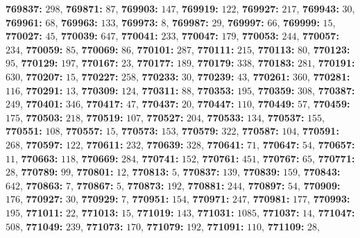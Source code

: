 \textsf{\bfseries 769837:} $298$, \textsf{\bfseries 769871:} $87$, \textsf{\bfseries 769903:} $147$, \textsf{\bfseries 769919:} $122$, \textsf{\bfseries 769927:} $217$, \textsf{\bfseries 769943:} $30$, \textsf{\bfseries 769961:} $68$, \textsf{\bfseries 769963:} $133$, \textsf{\bfseries 769973:} $8$, \textsf{\bfseries 769987:} $29$, \textsf{\bfseries 769997:} $66$, \textsf{\bfseries 769999:} $15$, \textsf{\bfseries 770027:} $45$, \textsf{\bfseries 770039:} $647$, \textsf{\bfseries 770041:} $233$, \textsf{\bfseries 770047:} $179$, \textsf{\bfseries 770053:} $244$, \textsf{\bfseries 770057:} $234$, \textsf{\bfseries 770059:} $85$, \textsf{\bfseries 770069:} $86$, \textsf{\bfseries 770101:} $287$, \textsf{\bfseries 770111:} $215$, \textsf{\bfseries 770113:} $80$, \textsf{\bfseries 770123:} $95$, \textsf{\bfseries 770129:} $197$, \textsf{\bfseries 770167:} $23$, \textsf{\bfseries 770177:} $189$, \textsf{\bfseries 770179:} $338$, \textsf{\bfseries 770183:} $281$, \textsf{\bfseries 770191:} $630$, \textsf{\bfseries 770207:} $15$, \textsf{\bfseries 770227:} $258$, \textsf{\bfseries 770233:} $30$, \textsf{\bfseries 770239:} $43$, \textsf{\bfseries 770261:} $360$, \textsf{\bfseries 770281:} $116$, \textsf{\bfseries 770291:} $13$, \textsf{\bfseries 770309:} $124$, \textsf{\bfseries 770311:} $88$, \textsf{\bfseries 770353:} $195$, \textsf{\bfseries 770359:} $308$, \textsf{\bfseries 770387:} $249$, \textsf{\bfseries 770401:} $346$, \textsf{\bfseries 770417:} $47$, \textsf{\bfseries 770437:} $20$, \textsf{\bfseries 770447:} $110$, \textsf{\bfseries 770449:} $57$, \textsf{\bfseries 770459:} $175$, \textsf{\bfseries 770503:} $218$, \textsf{\bfseries 770519:} $107$, \textsf{\bfseries 770527:} $204$, \textsf{\bfseries 770533:} $134$, \textsf{\bfseries 770537:} $155$, \textsf{\bfseries 770551:} $108$, \textsf{\bfseries 770557:} $15$, \textsf{\bfseries 770573:} $153$, \textsf{\bfseries 770579:} $322$, \textsf{\bfseries 770587:} $104$, \textsf{\bfseries 770591:} $268$, \textsf{\bfseries 770597:} $122$, \textsf{\bfseries 770611:} $232$, \textsf{\bfseries 770639:} $328$, \textsf{\bfseries 770641:} $71$, \textsf{\bfseries 770647:} $54$, \textsf{\bfseries 770657:} $11$, \textsf{\bfseries 770663:} $118$, \textsf{\bfseries 770669:} $284$, \textsf{\bfseries 770741:} $152$, \textsf{\bfseries 770761:} $451$, \textsf{\bfseries 770767:} $65$, \textsf{\bfseries 770771:} $28$, \textsf{\bfseries 770789:} $99$, \textsf{\bfseries 770801:} $12$, \textsf{\bfseries 770813:} $5$, \textsf{\bfseries 770837:} $139$, \textsf{\bfseries 770839:} $159$, \textsf{\bfseries 770843:} $642$, \textsf{\bfseries 770863:} $7$, \textsf{\bfseries 770867:} $5$, \textsf{\bfseries 770873:} $192$, \textsf{\bfseries 770881:} $244$, \textsf{\bfseries 770897:} $54$, \textsf{\bfseries 770909:} $176$, \textsf{\bfseries 770927:} $30$, \textsf{\bfseries 770929:} $7$, \textsf{\bfseries 770951:} $154$, \textsf{\bfseries 770971:} $247$, \textsf{\bfseries 770981:} $177$, \textsf{\bfseries 770993:} $195$, \textsf{\bfseries 771011:} $22$, \textsf{\bfseries 771013:} $15$, \textsf{\bfseries 771019:} $143$, \textsf{\bfseries 771031:} $1085$, \textsf{\bfseries 771037:} $14$, \textsf{\bfseries 771047:} $508$, \textsf{\bfseries 771049:} $239$, \textsf{\bfseries 771073:} $170$, \textsf{\bfseries 771079:} $192$, \textsf{\bfseries 771091:} $110$, \textsf{\bfseries 771109:} $28$, 
